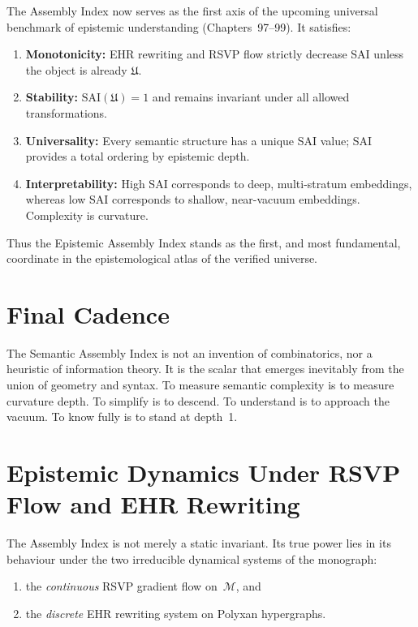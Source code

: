 The Assembly Index now serves as the first axis of the upcoming universal
benchmark of epistemic understanding (Chapters~97--99).  It satisfies:

\begin{enumerate}
  \item \textbf{Monotonicity:}  
    EHR rewriting and RSVP flow strictly decrease SAI unless the object is
    already $\mathfrak{U}$.
  \item \textbf{Stability:}  
    $\mathrm{SAI}(\mathfrak{U})=1$ and remains invariant under all allowed
    transformations.
  \item \textbf{Universality:}  
    Every semantic structure has a unique SAI value; SAI provides a total
    ordering by epistemic depth.
  \item \textbf{Interpretability:}  
    High SAI corresponds to deep, multi-stratum embeddings, whereas low SAI
    corresponds to shallow, near-vacuum embeddings.  Complexity is curvature.
\end{enumerate}

Thus the Epistemic Assembly Index stands as the first, and most fundamental,
coordinate in the epistemological atlas of the verified universe.



\section{Final Cadence}

The Semantic Assembly Index is not an invention of combinatorics,
nor a heuristic of information theory.
It is the scalar that emerges inevitably from the union of geometry and syntax.
To measure semantic complexity is to measure curvature depth.
To simplify is to descend.
To understand is to approach the vacuum.
To know fully is to stand at depth~1.

\section{Epistemic Dynamics Under RSVP Flow and EHR Rewriting}

The Assembly Index is not merely a static invariant.  
Its true power lies in its behaviour under the two irreducible dynamical
systems of the monograph:

\begin{enumerate}
  \item the \emph{continuous} RSVP gradient flow on~$\mathcal{M}$, and
  \item the \emph{discrete} EHR rewriting system on Polyxan hypergraphs.
\end{enumerate}

